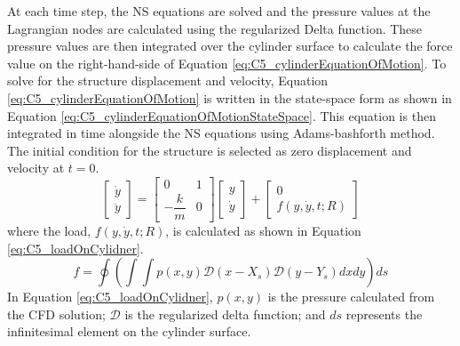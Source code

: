 At each time step, the NS equations are solved and the pressure values at the Lagrangian nodes are calculated using the regularized Delta function. These pressure values are then integrated over the cylinder surface to calculate the force value on the right-hand-side of Equation \eqref{eq:C5_cylinderEquationOfMotion}. To solve for the structure displacement and velocity, Equation \eqref{eq:C5_cylinderEquationOfMotion} is written in the state-space form as shown in Equation \eqref{eq:C5_cylinderEquationOfMotionStateSpace}. This equation is then integrated in time alongside the NS equations using Adams-bashforth method. The initial condition for the structure is selected as zero displacement and velocity at $t = 0$.
%
\begin{equation}\label{eq:C5_cylinderEquationOfMotionStateSpace}
	\begin{bmatrix}
	\dot{y} \\
	\ddot{y}
	\end{bmatrix} = 
	\begin{bmatrix}
	0 & 1 \\
	-\dfrac{k}{m} & 0
	\end{bmatrix}
	\begin{bmatrix}
	y \\
	\dot{y}
	\end{bmatrix} + 
	\begin{bmatrix}
	0 \\
	f(y, \dot{y}, t; R)
	\end{bmatrix}
\end{equation}
%
where the load, $f(y, \dot{y}, t; R)$, is calculated  as shown in Equation \eqref{eq:C5_loadOnCylidner}.
%
\begin{equation}\label{eq:C5_loadOnCylidner}
	f = \oint \left( \int \int p(x, y) \mathcal{D}(x - X_s) \mathcal{D}(y - Y_s) dx dy\right) ds
\end{equation}
%
In Equation \eqref{eq:C5_loadOnCylidner}, $p(x, y)$ is the pressure calculated from the CFD solution; $\mathcal{D}$ is the regularized delta function; and $ds$ represents the infinitesimal element on the cylinder surface.

